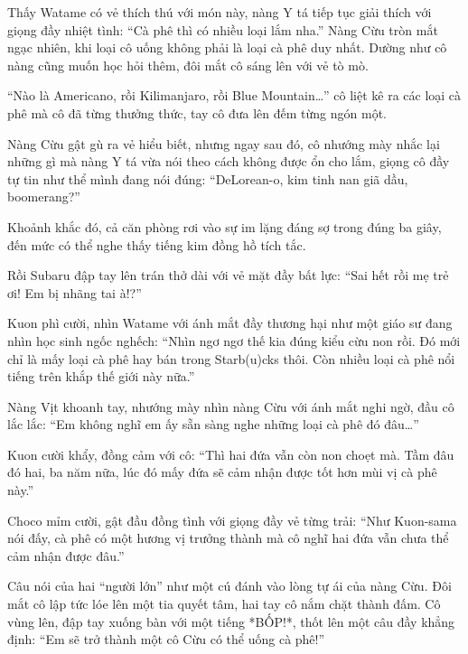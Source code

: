 \documentclass[../main.tex]{subfiles}
\begin{document}
Thấy Watame có vẻ thích thú với món này, nàng Y tá tiếp tục giải thích với giọng đầy nhiệt tình: ``Cà phê thì có nhiều loại lắm nha.'' Nàng Cừu tròn mắt ngạc nhiên, khi loại cô uống không phải là loại cà phê duy nhất. Dường như cô nàng cũng muốn học hỏi thêm, đôi mắt cô sáng lên với vẻ tò mò.

``Nào là Americano, rồi Kilimanjaro, rồi Blue Mountain\dots'' cô liệt kê ra các loại cà phê mà cô đã từng thưởng thức, tay cô đưa lên đếm từng ngón một.

\begin{figure}[H]
  \centering
\end{figure}

Nàng Cừu gật gù ra vẻ hiểu biết, nhưng ngay sau đó, cô nhướng mày nhắc lại những gì mà nàng Y tá vừa nói theo cách không được ổn cho lắm, giọng cô đầy tự tin như thể mình đang nói đúng: ``DeLorean-o, kim tinh nan giã dầu, boomerang?''

Khoảnh khắc đó, cả căn phòng rơi vào sự im lặng đáng sợ trong đúng ba giây, đến mức có thể nghe thấy tiếng kim đồng hồ tích tắc.

Rồi Subaru đập tay lên trán thở dài với vẻ mặt đầy bất lực: ``Sai hết rồi mẹ trẻ ơi! Em bị nhãng tai à!?''

Kuon phì cười, nhìn Watame với ánh mắt đầy thương hại như một giáo sư đang nhìn học sinh ngốc nghếch: ``Nhìn ngơ ngơ thế kia đúng kiểu cừu non rồi. Đó mới chỉ là mấy loại cà phê hay bán trong Starb(u)cks thôi. Còn nhiều loại cà phê nổi tiếng trên khắp thế giới này nữa.''

Nàng Vịt khoanh tay, nhướng mày nhìn nàng Cừu với ánh mắt nghi ngờ, đầu cô lắc lắc: ``Em không nghĩ em ấy sẵn sàng nghe những loại cà phê đó đâu\dots''

Kuon cười khẩy, đồng cảm với cô: ``Thì hai đứa vẫn còn non choẹt mà. Tầm đâu đó hai, ba năm nữa, lúc đó mấy đứa sẽ cảm nhận được tốt hơn mùi vị cà phê này.''

Choco mỉm cười, gật đầu đồng tình với giọng đầy vẻ từng trải: ``Như Kuon-sama nói đấy, cà phê có một hương vị trưởng thành mà cô nghĩ hai đứa vẫn chưa thể cảm nhận được đâu.''

Câu nói của hai ``người lớn'' như một cú đánh vào lòng tự ái của nàng Cừu. Đôi mắt cô lập tức lóe lên một tia quyết tâm, hai tay cô nắm chặt thành đấm. Cô vùng lên, đập tay xuống bàn với một tiếng *BỐP!*, thốt lên một câu đầy khẳng định: ``Em sẽ trở thành một cô Cừu có thể uống cà phê!''
\end{document}
